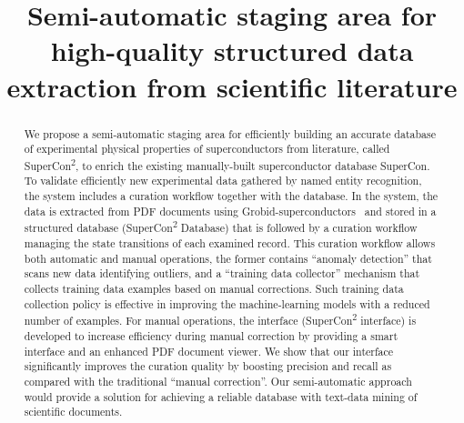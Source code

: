 \documentclass[]{interact}
\theoremstyle{plain} %
\theoremstyle{definition}
\theoremstyle{remark}
\begin{document}

\title{Semi-automatic staging area for high-quality structured data extraction from scientific literature}

\author{
}

\maketitle

\begin{abstract}
We propose a semi-automatic staging area for efficiently building an accurate database of experimental physical properties of superconductors from literature, called SuperCon\textsuperscript{2}, to enrich the existing manually-built superconductor database SuperCon. To validate efficiently new experimental data gathered by named entity recognition, the system includes a curation workflow together with the database. In the system, the data is extracted from PDF documents using Grobid-superconductors~\cite{lfoppiano2023automatic} and stored in a structured database (SuperCon\textsuperscript{2} Database) that is followed by a curation workflow managing the state transitions of each examined record. This curation workflow allows both automatic and manual operations, the former contains ``anomaly detection'' that scans new data identifying outliers, and a ``training data collector'' mechanism that collects training data examples based on manual corrections. Such training data collection policy is effective in improving the machine-learning models with a reduced number of examples. For manual operations, the interface (SuperCon\textsuperscript{2} interface) is developed to increase efficiency during manual correction by providing a smart interface and an enhanced PDF document viewer. We show that our interface significantly improves the curation quality by boosting precision and recall as compared with the traditional ``manual correction''.  Our semi-automatic approach would provide a solution for achieving a reliable database with text-data mining of scientific documents.

\end{abstract}
\end{document}
